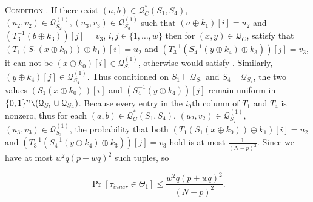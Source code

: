 \noindent \textsc{Condition \cone}. If there exist $(a, b) \in \mathcal{Q}_{C}^{*}\left(S_{1}, S_{4}\right)$, $(u_{2}, v_{2}) \in \mathcal{Q}_{S_{2}}^{(1)}, (u_{3}, v_{3}) \in \mathcal{Q}_{S_{3}}^{(1)}$ such that $\left(a \oplus k_{1}\right)[i]=u_2$ and $\left(T_{3}^{-1}\left(b \oplus k_{3}\right)\right)[j]=v_3$, $i, j \in\{1, \ldots, w\}$ then for $(x, y) \in \mathcal{Q}_{C}$, satisfy that $\left(T_{1}\left(S_{1}\left(x \oplus k_{0}\right)\right) \oplus k_{1}\right)[i]=u_2$ and $\left(T_{3}^{-1}\left(S_{4}^{-1}\left(y \oplus k_{4}\right) \oplus k_{3}\right)\right)[j]=v_3$, it can not be $\left(x \oplus k_{0}\right)[i] \in \mathcal{Q}_{S_{1}}^{(1)}$, otherwise would satisfy \btwo. Similarly, $\left(y \oplus k_{4}\right)[j] \in \mathcal{Q}_{S_{4}}^{(1)}$. Thus conditioned on $S_{1} \vdash \mathcal{Q}_{S_{1}}$ and $S_{4} \vdash \mathcal{Q}_{S_{4}}$, the two values $\left(S_{1}\left(x \oplus k_{0}\right)\right)[i]$ and $\left(S_{4}^{-1}\left(y \oplus k_{4}\right)\right)[j]$  remain uniform in $\{0, 1\}^{n} \verb|\| (\mathcal{Q}_{S_{1}} \cup \mathcal{Q}_{S_{4}})$. Because every entry in the $i_{0}$th column of $T_{1}$ and $T_{4}$ is nonzero, thus for each $(a, b) \in \mathcal{Q}_{C}^{*}\left(S_{1}, S_{4}\right)$, $(u_{2}, v_{2}) \in \mathcal{Q}_{S_{2}}^{(1)}$, $(u_{3}, v_{3}) \in \mathcal{Q}_{S_{3}}^{(1)}$, the probability that both $\left(T_{1}\left(S_{1}\left(x \oplus k_{0}\right)\right) \oplus k_{1}\right)[i]=u_2$ and $\left(T_{3}^{-1}\left(S_{4}^{-1}\left(y \oplus k_{4}\right) \oplus k_{3}\right)\right)[j] = v_3$ hold is at most $\frac{1}{(N-p)^{2}}$. Since we have at most $w^{2} q (p+w q)^{2}$ such tuples, so

$$
\operatorname{Pr}\left[\tau_{inner} \in \Theta_{1}\right] \leq \frac{w^{2} q (p+w q)^{2}}{(N-p)^{2}}.
$$

